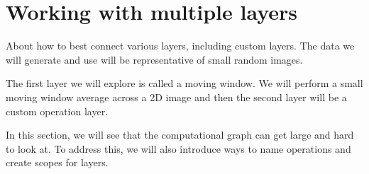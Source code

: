 \documentclass[twoside]{article}
\begin{document}
\section{Working with multiple layers}
About how to best connect various layers, including custom layers. The data we will generate and use will be representative of small random images.

The first layer we will explore is called a moving window. We will perform a small moving window average across a 2D image and then the second layer will be a custom operation layer.

In this section, we will see that the computational graph can get large and hard to look at. To address this, we will also introduce ways to name operations and create scopes for layers. 
\end{document}
